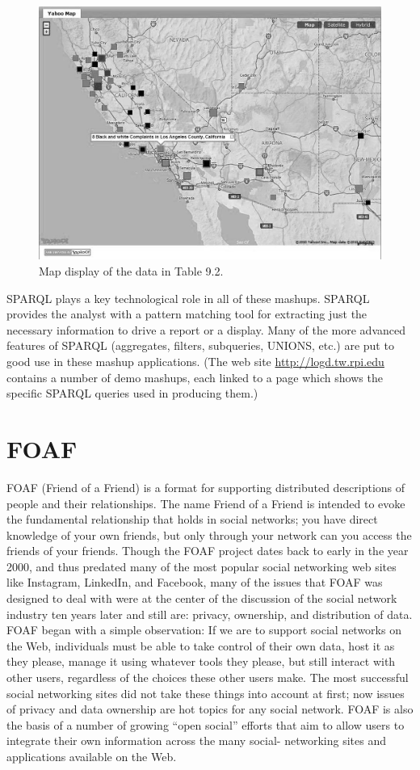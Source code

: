 \begin{figure}
\centering
\includegraphics[width=5in]{media/ch10/f10-02.png}
\caption{Map display of the data in Table 9.2.}
\label{fig:ch10.2}
\end{figure}


SPARQL plays a key technological role in all of these mashups. SPARQL
provides the analyst with a pattern matching tool for extracting just
the necessary information to drive a report or a display. Many of the
more advanced features of SPARQL (aggregates, filters, subqueries,
UNIONS, etc.) are put to good use in these mashup applications. (The web
site \url{http://logd.tw.rpi.edu} contains a number of demo mashups,
each linked to a page which shows the specific SPARQL queries used in
producing them.)

\section{FOAF}
\label{foaf}
FOAF (Friend of a Friend) is a format for supporting distributed
descriptions of people and their relationships. The name Friend of a
Friend is intended to evoke the fundamental relationship that holds in
social networks; you have direct knowledge of your own friends, but only
through your network can you access the friends of your friends. Though
the FOAF project dates back to early in the year 2000, and thus predated
many of the most popular social networking web sites like Instagram,
LinkedIn, and Facebook, many of the issues that FOAF was designed to
deal with were at the center of the discussion of the social network
industry ten years later and still are: privacy, ownership, and
distribution of data. FOAF began with a simple observation: If we are to
support social networks on the Web, individuals must be able to take
control of their own data, host it as they please, manage it using
whatever tools they please, but still interact with other users,
regardless of the choices these other users make. The most successful
social networking sites did not take these things into account at first;
now issues of privacy and data ownership are hot topics for any social
network. FOAF is also the basis of a number of growing ``open social''
efforts that aim to allow users to integrate their own information
across the many social- networking sites and applications available on
the Web.

